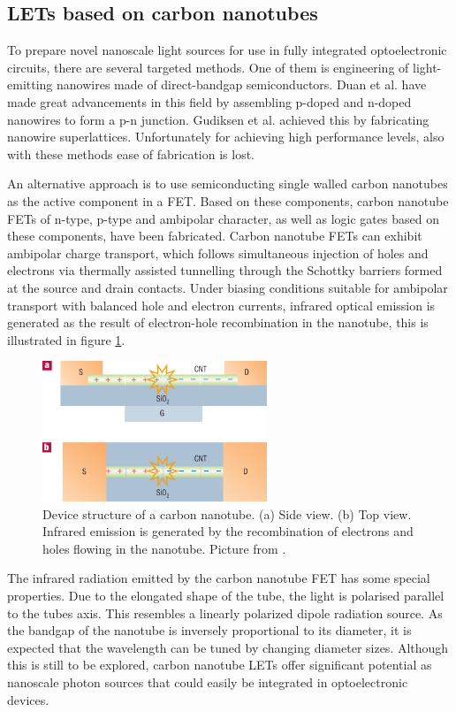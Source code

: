 \subsection{LETs based on carbon nanotubes} %

To prepare novel nanoscale light sources for use in fully integrated optoelectronic circuits, there are several targeted methods. One of them is engineering of light-emitting nanowires made of direct-bandgap semiconductors. Duan et al. have made great advancements in this field by assembling p-doped and n-doped nanowires to form a p-n junction. Gudiksen et al. achieved this by fabricating nanowire superlattices. Unfortunately for achieving high performance levels, also with these methods ease of fabrication is lost.

An alternative approach is to use semiconducting single walled carbon nanotubes as the active component in a FET. Based on these components, carbon nanotube FETs of n-type, p-type and ambipolar character, as well as logic gates based on these components, have been fabricated. Carbon nanotube FETs can exhibit ambipolar charge transport, which follows simultaneous injection of holes and electrons via thermally assisted tunnelling through the Schottky barriers formed at the source and drain contacts. Under biasing conditions suitable for ambipolar transport with balanced hole and electron currents, infrared optical emission is generated as the result of electron-hole recombination in the nanotube, this is illustrated in figure \ref{fig:carbontube}. 

\begin{figure}[!ht]
 \begin{center}
  \includegraphics[width=0.6\textwidth]{fig_1}
  \caption{Device structure of a carbon nanotube. (a) Side view. (b) Top view. Infrared emission is generated by the recombination of electrons and holes flowing in the nanotube. Picture from \citet{Muccini}.}
  \label{fig:carbontube}
 \end{center}
\end{figure}

The infrared radiation emitted by the carbon nanotube FET has some special properties. Due to the elongated shape of the tube, the light is polarised parallel to the tubes axis. This resembles a linearly polarized dipole radiation source. As the bandgap of the nanotube is inversely proportional to its diameter, it is expected that the wavelength can be tuned by changing diameter sizes. Although this is still to be explored, carbon nanotube LETs offer significant potential as nanoscale photon sources that could easily be integrated in optoelectronic devices.

